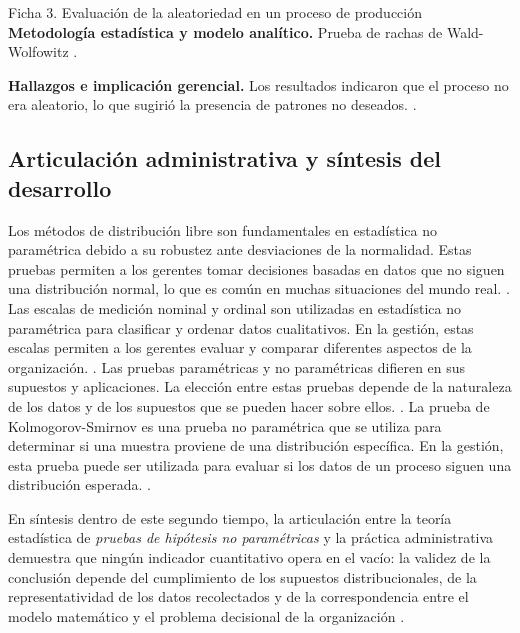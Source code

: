 {\begin{fichainvestigacion}{Ficha 3. Evaluación de la aleatoriedad en un proceso de producción}
\textbf{Metodología estadística y modelo analítico.} Prueba de rachas de Wald-Wolfowitz \citep{wackerly2010,lind2012}.

\textbf{Hallazgos e implicación gerencial.} Los resultados indicaron que el proceso no era aleatorio, lo que sugirió la presencia de patrones no deseados. \citep{nistHandbook}.
\end{fichainvestigacion}


\subsection{Articulación administrativa y síntesis del desarrollo}
Los métodos de distribución libre son fundamentales en estadística no paramétrica debido a su robustez ante desviaciones de la normalidad. Estas pruebas permiten a los gerentes tomar decisiones basadas en datos que no siguen una distribución normal, lo que es común en muchas situaciones del mundo real. \citep{holmesBusiness2023,nistHandbook}.
Las escalas de medición nominal y ordinal son utilizadas en estadística no paramétrica para clasificar y ordenar datos cualitativos. En la gestión, estas escalas permiten a los gerentes evaluar y comparar diferentes aspectos de la organización. \citep{holmesBusiness2023,nistHandbook}.
Las pruebas paramétricas y no paramétricas difieren en sus supuestos y aplicaciones. La elección entre estas pruebas depende de la naturaleza de los datos y de los supuestos que se pueden hacer sobre ellos. \citep{holmesBusiness2023,nistHandbook}.
La prueba de Kolmogorov-Smirnov es una prueba no paramétrica que se utiliza para determinar si una muestra proviene de una distribución específica. En la gestión, esta prueba puede ser utilizada para evaluar si los datos de un proceso siguen una distribución esperada. \citep{holmesBusiness2023,nistHandbook}.

En síntesis dentro de este segundo tiempo, la articulación entre la teoría estadística de \textit{pruebas de hipótesis no paramétricas} y la práctica administrativa demuestra que ningún indicador cuantitativo opera en el vacío: la validez de la conclusión depende del cumplimiento de los supuestos distribucionales, de la representatividad de los datos recolectados y de la correspondencia entre el modelo matemático y el problema decisional de la organización \citep{anderson2012,nistHandbook,guarin2002}.

\clearpage
}
